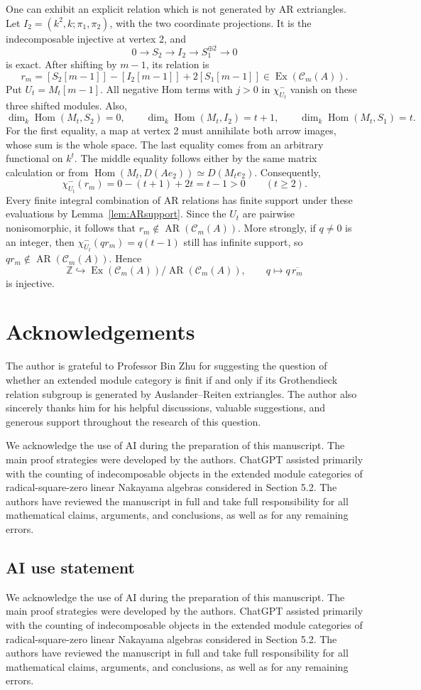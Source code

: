 \documentclass[pdflatex,sn-mathphys-num]{sn-jnl}
\numberwithin{equation}{section}
\theoremstyle{definition}
\theoremstyle{remark}\newtheorem{remark}[theorem]{Remark}
\newcommand{\C}{\mathcal C}
\newcommand{\Hom}{\operatorname{Hom}}
\newcommand{\Ex}{\operatorname{Ex}}
\newcommand{\AR}{\operatorname{AR}}
\newcommand{\dimk}{\dim_k}
\newcommand{\AIUseStatement}{We acknowledge the use of AI during the preparation of this manuscript. The main proof strategies were developed by the authors. ChatGPT assisted primarily with the counting of indecomposable objects in the extended module categories of radical-square-zero linear Nakayama algebras considered in Section 5.2. The authors have reviewed the manuscript in full and take full responsibility for all mathematical claims, arguments, and conclusions, as well as for any remaining errors.}
\newcommand{\CompetingInterestsStatement}{The authors declare no competing interests.}
\newcommand{\DataAvailabilityStatement}{Data sharing is not applicable to this article as no datasets were generated or analysed during the current study.}
\newcommand{\AuthorContributionsStatement}{}
\newcommand{\PrintDeclaration}[2]{%
  \ifx#2\empty\else\subsection*{#1}#2\par\fi}
\begin{document}
One can exhibit an explicit relation which is not generated by AR
extriangles. Let
$I_2=(k^2,k;\pi_1,\pi_2)$, with the two coordinate projections.
It is the indecomposable injective at vertex 2, and
\[
 0\longrightarrow S_2\longrightarrow I_2
   \longrightarrow S_1^{\oplus2}\longrightarrow0
\]
is exact. After shifting by $m-1$, its relation is
\[
 r_m=[S_2[m-1]]-[I_2[m-1]]+2[S_1[m-1]]\in\Ex(\C_m(A)).
\]
Put $U_t=M_t[m-1]$. All negative Hom terms with $j>0$ in
$\chi^-_{U_t}$ vanish on these three shifted modules. Also,
\[
 \dimk\Hom(M_t,S_2)=0,\qquad
 \dimk\Hom(M_t,I_2)=t+1,\qquad
 \dimk\Hom(M_t,S_1)=t.
\]
For the first equality, a map at vertex 2 must annihilate both arrow
images, whose sum is the whole space. The last equality comes from an
arbitrary functional on $k^t$. The middle equality follows either by
the same matrix calculation or from
$\Hom(M_t,D(Ae_2))\simeq D(M_te_2)$.
Consequently,
\[
 \chi^-_{U_t}(r_m)=0-(t+1)+2t=t-1>0\qquad(t\geq2).
\]
Every finite integral combination of AR relations has finite support
under these evaluations by Lemma~\ref{lem:ARsupport}. Since the $U_t$ are
pairwise nonisomorphic, it follows that $r_m\notin\AR(\C_m(A))$.
More strongly, if $q\ne0$ is an integer, then
$\chi^-_{U_t}(q r_m)=q(t-1)$ still has infinite support, so
$q r_m\notin\AR(\C_m(A))$. Hence
\[
 \mathbb Z\hookrightarrow\Ex(\C_m(A))/\AR(\C_m(A)),\qquad
 q\longmapsto q\,\overline{r_m}
\]
is injective.

\section*{Acknowledgements}

The author is grateful to Professor Bin Zhu for suggesting the
question of whether an extended module category is finit if and only if its Grothendieck relation
subgroup is generated by Auslander--Reiten extriangles.
The author also sincerely thanks him for his helpful discussions,
valuable suggestions, and generous support throughout the
research of this question.


\PrintDeclaration{AI use statement}{\AIUseStatement}
\end{document}
